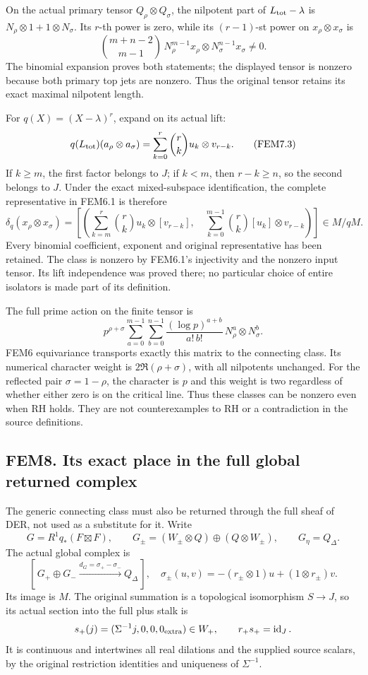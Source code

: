 On the actual primary tensor \(Q_\rho\otimes Q_\sigma\), the nilpotent
part of \(L_{\rm tot}-\lambda\) is \(N_\rho\otimes1+1\otimes N_\sigma\).
Its \(r\)-th power is zero, while its \((r-1)\)-st power on
\(x_\rho\otimes x_\sigma\) is \[
\binom{m+n-2}{m-1}\,
N_\rho^{m-1}x_\rho\otimes N_\sigma^{n-1}x_\sigma\ne0.
\tag{FEM7.2}
\] The binomial expansion proves both statements; the displayed tensor
is nonzero because both primary top jets are nonzero. Thus the original
tensor retains its exact maximal nilpotent length.

For \(q(X)=(X-\lambda)^r\), expand on its actual lift: \[
q(L_{\rm tot})(a_\rho\otimes a_\sigma)
=\sum_{k=0}^{r}\binom rk u_k\otimes v_{r-k}.
\tag{FEM7.3}
\] If \(k\geq m\), the first factor belongs to \(J\); if \(k<m\), then
\(r-k\geq n\), so the second belongs to \(J\). Under the exact
mixed-subspace identification, the complete representative in FEM6.1 is
therefore \[
\boxed{
\delta_q(x_\rho\otimes x_\sigma)=
\left[
\left(
 \sum_{k=m}^{r}\binom rk u_k\otimes[v_{r-k}],
 \quad
 \sum_{k=0}^{m-1}\binom rk [u_k]\otimes v_{r-k}
\right)
\right]\in M/qM.}
\tag{FEM7.4}
\] Every binomial coefficient, exponent and original representative has
been retained. The class is nonzero by FEM6.1's injectivity and the
nonzero input tensor. Its lift independence was proved there; no
particular choice of entire isolators is made part of its definition.

The full prime action on the finite tensor is \[
p^{\rho+\sigma}
 \sum_{a=0}^{m-1}\sum_{b=0}^{n-1}
 \frac{(\log p)^{a+b}}{a!\,b!}\,
 N_\rho^a\otimes N_\sigma^b.
\tag{FEM7.5}
\] FEM6 equivariance transports exactly this matrix to the connecting
class. Its numerical character weight is \(2\Re(\rho+\sigma)\), with all
nilpotents unchanged. For the reflected pair \(\sigma=1-\rho\), the
character is \(p\) and this weight is two regardless of whether either
zero is on the critical line. Thus these classes can be nonzero even
when RH holds. They are not counterexamples to RH or a contradiction in
the source definitions.

\subsection{FEM8. Its exact place in the full global returned
complex}\label{fem8.-its-exact-place-in-the-full-global-returned-complex}

The generic connecting class must also be returned through the full
sheaf of DER, not used as a substitute for it. Write \[
G=R^1q_*(F\boxtimes F),\qquad
G_\pm=(W_\pm\otimes Q)\oplus(Q\otimes W_\pm),\qquad
G_\eta=Q_\Delta.
\] The actual global complex is \[
[\,G_+\oplus G_-\xrightarrow{d_G=\sigma_+-\sigma_-}Q_\Delta\,],
\quad
\sigma_\pm(u,v)=-(r_\pm\otimes1)u+(1\otimes r_\pm)v.
\tag{FEM8.1}
\] Its image is \(M\). The original summation is a topological
isomorphism \(S\to J\), so its actual section into the full plus stalk
is \[
s_+(j)=(\Sigma^{-1}j,0,0,0_{\rm extra})\in W_+,\qquad r_+s_+=\operatorname{id}_J.
\] It is continuous and intertwines all real dilations and the supplied
source scalars, by the original restriction identities and uniqueness of
\(\Sigma^{-1}\).

